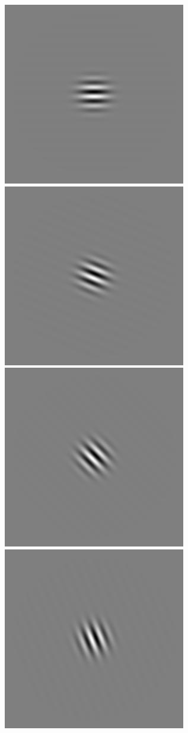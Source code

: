 \begin{figure}
\begin{center}
 \includegraphics[scale=0.1]{ch4/figures/rGabor3_4.jpg}
 \includegraphics[scale=0.1]{ch4/figures/rGabor3_5.jpg}
 \includegraphics[scale=0.1]{ch4/figures/rGabor3_6.jpg}
 \includegraphics[scale=0.1]{ch4/figures/rGabor3_7.jpg}\\

\end{center}
\end{figure}
